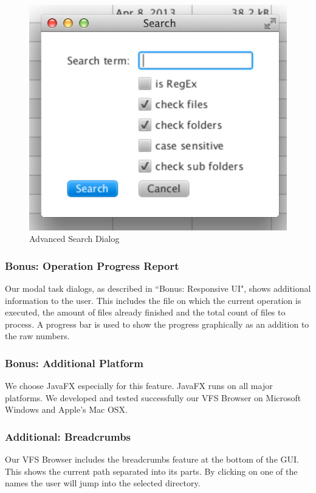 \documentclass[a4paper,12pt]{article}
\begin{document}
\begin{figure}[h]
    \includegraphics{screen2.png}
    \caption{Advanced Search Dialog}
\end{figure}

\subsubsection{Bonus: Operation Progress Report}
Our modal task dialogs, as described in ``Bonus: Responsive UI", shows additional information to the user. This includes the file on which the current operation is executed, the amount of files already finished and the total count of files to process. A progress bar is used to show the progress graphically as an addition to the raw numbers.

\subsubsection{Bonus: Additional Platform}
We choose JavaFX especially for this feature. JavaFX runs on all major platforms. We developed and tested successfully our VFS Browser on Microsoft Windows and Apple's Mac OSX.

\subsubsection{Additional: Breadcrumbs}
Our VFS Browser includes the breadcrumbs feature at the bottom of the GUI. This shows the current path separated into its parts. By clicking on one of the names the user will jump into the selected directory.
\end{document}
